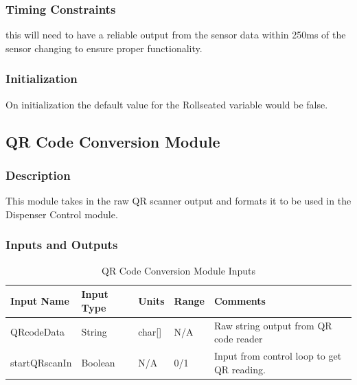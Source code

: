 \documentclass[12pt,titlepage]{article}
\begin{document}
\subsubsection*{Timing Constraints}
this will need to have a reliable output from the sensor data within 250ms of the sensor changing to ensure proper functionality.
\subsubsection*{Initialization}
On initialization the default value for the Rollseated variable would be false.

\subsection{QR Code Conversion Module}
\subsubsection*{Description}
This module takes in the raw QR scanner output and formats it to be used in the Dispenser Control module. 
\subsubsection*{Inputs and Outputs}
\begin{table}[ht!]
\begin{center}
\begin{adjustbox}{max width=\textwidth}
\small
\begin{tabular}{|p{}|p{}|p{}|p{}|p{}|}
 \hline
 \textbf{Input Name} & \textbf{Input Type} & \textbf{Units} &\textbf{Range} & \textbf{Comments} \\
 \hline 
 QRcodeData & String & char[] & N/A & Raw string output from QR code reader \\
 \hline
 startQRscanIn & Boolean & N/A & 0/1 & Input from control loop to get QR reading. \\
 \hline
\end{tabular}
\end{adjustbox}
\end{center}
\caption{QR Code Conversion Module Inputs}
\end{table}
\end{document}
